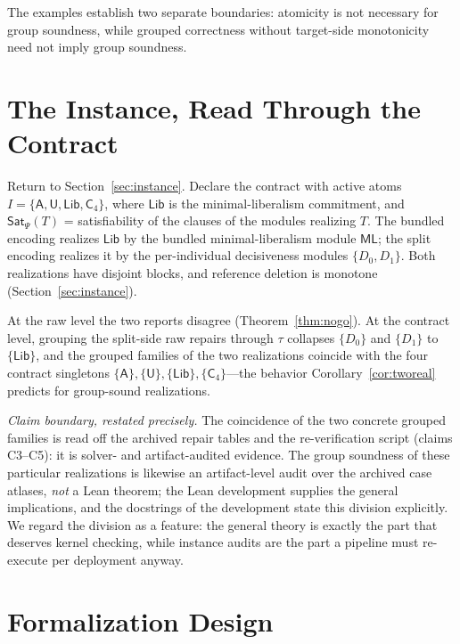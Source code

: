 \documentclass[sigplan,10pt,review,anonymous]{acmart}
\theoremstyle{acmdefinition}
\newcommand{\SatPsi}{{\mathsf{Sat}_\Psi}}
\newcommand{\ML}{\mathsf{ML}}
\newcommand{\modsym}[1]{\mathsf{#1}}
\begin{document}
The examples establish two separate boundaries: atomicity is not necessary
for group soundness, while grouped correctness without target-side monotonicity
need not imply group soundness.

\section{The Instance, Read Through the Contract}
\label{sec:back}

Return to Section~\ref{sec:instance}. Declare the contract with active atoms
$I = \{\modsym{A}, \modsym{U}, \mathsf{Lib}, \mathsf{C}_4\}$, where
$\mathsf{Lib}$ is the minimal-liberalism commitment, and $\SatPsi(T)$ =
satisfiability of the clauses of the modules realizing $T$. The bundled
encoding realizes $\mathsf{Lib}$ by the bundled minimal-liberalism module
$\ML$; the split encoding realizes it by the per-individual decisiveness
modules $\{D_0, D_1\}$. Both realizations have disjoint blocks, and reference
deletion is monotone (Section~\ref{sec:instance}).

At the raw level the two reports disagree (Theorem~\ref{thm:nogo}). At the
contract level, grouping the split-side raw repairs through $\tau$ collapses
$\{D_0\}$ and $\{D_1\}$ to $\{\mathsf{Lib}\}$, and the grouped families of
the two realizations coincide with the four contract singletons
$\{\modsym{A}\}, \{\modsym{U}\}, \{\mathsf{Lib}\}, \{\mathsf{C}_4\}$---the
behavior Corollary~\ref{cor:tworeal} predicts for group-sound realizations.

\emph{Claim boundary, restated precisely.} The coincidence of the two
concrete grouped families is read off the archived repair tables and the
re-verification script (claims C3--C5): it is solver- and artifact-audited
evidence. The group soundness of these particular realizations is likewise an
artifact-level audit over the archived case atlases, \emph{not} a Lean
theorem; the Lean development supplies the general implications, and the
docstrings of the development state this division explicitly. We regard the
division as a feature: the general theory is exactly the part that deserves
kernel checking, while instance audits are the part a pipeline must
re-execute per deployment anyway.

\section{Formalization Design}
\label{sec:design}
\end{document}
